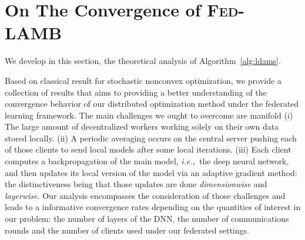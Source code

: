 \documentclass[11pt]{article}
\newcommand{\interl}{\llbracket L \rrbracket}
\def\tot{\mathsf{h}}
\newcommand{\ie}{{\em i.e.,~}}
\newcommand{\algo}{\textsc{Fed-LAMB}}
\begin{document}
\section{On The Convergence of \algo}\label{sec:theory}
We develop in this section, the theoretical analysis of Algorithm~\ref{alg:ldams}. 


Based on classical result for stochastic nonconvex optimization, we provide a collection of results that aims to providing a better understanding of the convergence behavior of our distributed optimization method under the federated learning framework.
The main challenges we ought to overcome are manifold 
(i) The large amount of decentralized workers working solely on their own data stored locally. 
(ii) A periodic averaging occurs on the central server pushing each of those clients to send local models after some local iterations. 
(iii) Each client computes a backpropagation of the main model, \ie the deep neural network, and then updates its local version of the model via an adaptive gradient method: the distinctiveness being that those updates are done \emph{dimensionwise} and \emph{layerwise}.
Our analysis encompasses the consideration of those challenges and leads to a informative convergence rates depending on the quantities of interest in our problem: the number of layers of the DNN, the number of communications rounds and the number of clients used under our federated settings.
\end{document}
